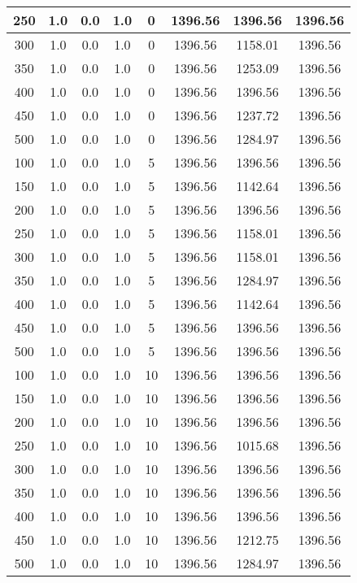 \documentclass[a4paper, 12pt]{extreport}
\begin{document}
\begin{itemize}
\begin{longtable}{|c|c|c|c|c|c|c|c|}
			250 & 1.0 & 0.0 & 1.0 & 0 & 1396.56 & 1396.56 & 1396.56 \\\hline
			300 & 1.0 & 0.0 & 1.0 & 0 & 1396.56 & 1158.01 & 1396.56 \\\hline
			350 & 1.0 & 0.0 & 1.0 & 0 & 1396.56 & 1253.09 & 1396.56 \\\hline
			400 & 1.0 & 0.0 & 1.0 & 0 & 1396.56 & 1396.56 & 1396.56 \\\hline
			450 & 1.0 & 0.0 & 1.0 & 0 & 1396.56 & 1237.72 & 1396.56 \\\hline
			500 & 1.0 & 0.0 & 1.0 & 0 & 1396.56 & 1284.97 & 1396.56 \\\hline
			100 & 1.0 & 0.0 & 1.0 & 5 & 1396.56 & 1396.56 & 1396.56 \\\hline
			150 & 1.0 & 0.0 & 1.0 & 5 & 1396.56 & 1142.64 & 1396.56 \\\hline
			200 & 1.0 & 0.0 & 1.0 & 5 & 1396.56 & 1396.56 & 1396.56 \\\hline
			250 & 1.0 & 0.0 & 1.0 & 5 & 1396.56 & 1158.01 & 1396.56 \\\hline
			300 & 1.0 & 0.0 & 1.0 & 5 & 1396.56 & 1158.01 & 1396.56 \\\hline
			350 & 1.0 & 0.0 & 1.0 & 5 & 1396.56 & 1284.97 & 1396.56 \\\hline
			400 & 1.0 & 0.0 & 1.0 & 5 & 1396.56 & 1142.64 & 1396.56 \\\hline
			450 & 1.0 & 0.0 & 1.0 & 5 & 1396.56 & 1396.56 & 1396.56 \\\hline
			500 & 1.0 & 0.0 & 1.0 & 5 & 1396.56 & 1396.56 & 1396.56 \\\hline
			100 & 1.0 & 0.0 & 1.0 & 10 & 1396.56 & 1396.56 & 1396.56 \\\hline
			150 & 1.0 & 0.0 & 1.0 & 10 & 1396.56 & 1396.56 & 1396.56 \\\hline
			200 & 1.0 & 0.0 & 1.0 & 10 & 1396.56 & 1396.56 & 1396.56 \\\hline
			250 & 1.0 & 0.0 & 1.0 & 10 & 1396.56 & 1015.68 & 1396.56 \\\hline
			300 & 1.0 & 0.0 & 1.0 & 10 & 1396.56 & 1396.56 & 1396.56 \\\hline
			350 & 1.0 & 0.0 & 1.0 & 10 & 1396.56 & 1396.56 & 1396.56 \\\hline
			400 & 1.0 & 0.0 & 1.0 & 10 & 1396.56 & 1396.56 & 1396.56 \\\hline
			450 & 1.0 & 0.0 & 1.0 & 10 & 1396.56 & 1212.75 & 1396.56 \\\hline
			500 & 1.0 & 0.0 & 1.0 & 10 & 1396.56 & 1284.97 & 1396.56 \\\hline

\end{longtable}
\end{itemize}
\end{document}
